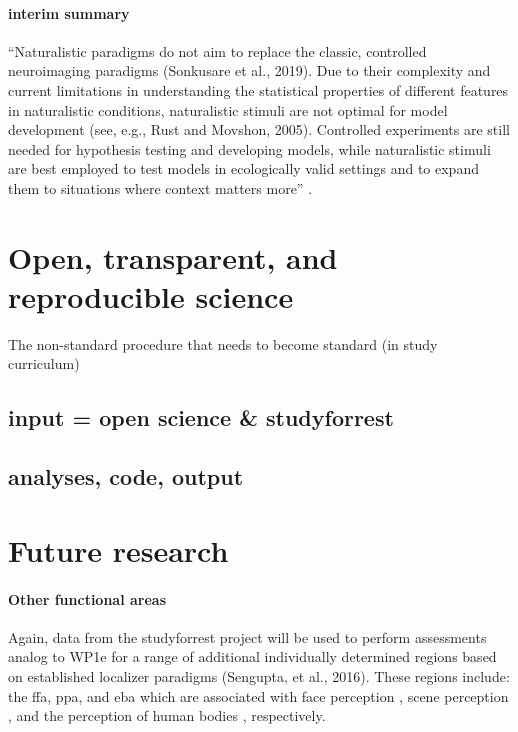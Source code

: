 \paragraph{interim summary}

``Naturalistic paradigms do not aim to replace the classic, controlled
neuroimaging paradigms (Sonkusare et al., 2019). Due to their complexity and
current limitations in understanding the statistical properties of different
features in naturalistic conditions, naturalistic stimuli are not optimal for
model development (see, e.g., Rust and Movshon, 2005). Controlled experiments
are still needed for hypothesis testing and developing models, while
naturalistic stimuli are best employed to test models in ecologically valid
settings and to expand them to situations where context matters
more'' \citep{saarimaki2021naturalistic}.



\section{Open, transparent, and reproducible science}

%
The non-standard procedure that needs to become standard (in study curriculum)

\subsection{input = open science \& studyforrest}

\subsection{analyses, code, output}



\section{Future research}

\paragraph{Other functional areas}

Again, data from the studyforrest project will be used to perform assessments
analog to WP1e for a range of additional individually determined regions based
on established localizer paradigms (Sengupta, et al., 2016).
%
These regions include: the \ac{ffa}, \ac{ppa}, and \ac{eba}  which are
associated with face perception \citep{kanwisher1997ffa,
pitcher2011occipitalfacearea}, scene perception \citep{epstein1998ppa}, and the
perception of human bodies \citep{downing2001bodyarea}, respectively.

